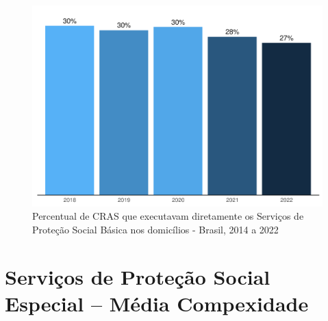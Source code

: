 \documentclass[
  brazilian]{report}
\begin{document}
\begin{figure}
\includegraphics{Censo-SUAS-2022_files/figure-latex/CRAS-PSB-1} \caption[Percentual de CRAS que executavam diretamente os Serviços de Proteção Social Básica nos domicílios - Brasil, 2014 a 2022]{Percentual de CRAS que executavam diretamente os Serviços de Proteção Social Básica nos domicílios - Brasil, 2014 a 2022}\label{fig:CRAS-PSB}
\end{figure}

\hypertarget{serviuxe7os-de-proteuxe7uxe3o-social-especial-muxe9dia-compexidade}{%
\section{Serviços de Proteção Social Especial -- Média
Compexidade}\label{serviuxe7os-de-proteuxe7uxe3o-social-especial-muxe9dia-compexidade}}
\end{document}
